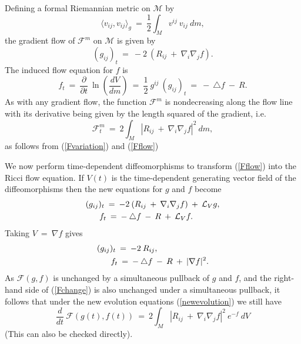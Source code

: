 \documentclass[12pt]{amsart}
\numberwithin{equation}{section}
\theoremstyle{plain}
\theoremstyle{definition}
\theoremstyle{remark}
\begin{document}
Defining a formal Riemannian metric on ${\mathcal M}$ by
\begin{equation}
\langle v_{ij}, v_{ij} \rangle_{g} \: = \: \frac12
\int_M v^{ij} \: v_{ij} \: dm, 
\end{equation}
the gradient flow of ${\mathcal F}^m$ on ${\mathcal M}$
is given by
\begin{equation} \label{Fflow}
(g_{ij})_t \: = \: -2 \: (R_{ij} \: + \: \nabla_i \nabla_j f).
\end{equation}
The induced flow equation for $f$ is
\begin{equation}
f_t \: = \: \frac{\partial}{\partial t} \: \ln \left( \frac{dV}{dm}\right) 
\: = \: \frac12 \: g^{ij} \: (g_{ij})_t \: = \: - \: \triangle f \: - \: R.
\end{equation}
As with any gradient flow, the function ${\mathcal F}^m$ is nondecreasing
along the flow line with its derivative being given by the
length squared of the gradient, i.e.
\begin{equation} \label{Fchange}
{\mathcal F}^m_t \: = \: 2 \int_M |R_{ij} \: + \: \nabla_i \nabla_j f|^2 \: dm,
\end{equation}
as follows from (\ref{Fvariation}) and (\ref{Fflow})

We now perform time-dependent 
diffeomorphisms to transform (\ref{Fflow}) into the
Ricci flow equation. If $V(t)$ is the time-dependent generating vector field
of the diffeomorphisms then the new equations for $g$ and $f$ become
\begin{align}
(g_{ij})_t \: & = \: -2 \: (R_{ij} \: + \: \nabla_i \nabla_j f) \: + \:
{\mathcal L}_V g, \\
f_t & \: = \: - \: \triangle f \: - \: R \: + \: {\mathcal L}_V f. \notag
\end{align}
Taking $V \: = \: \nabla f$ gives
\begin{align} \label{newevolution}
(g_{ij})_t \: & = \: -2 \: R_{ij}, \\
f_t & \: = \: - \: \triangle f \: - \: R \: + \: |\nabla f|^2. \notag
\end{align}
As ${\mathcal F}(g, f)$ is unchanged by a simultaneous pullback of $g$ and $f$,
and the right-hand side of (\ref{Fchange}) is also unchanged under a
simultaneous pullback, it follows that 
under the new evolution equations (\ref{newevolution})
we still have
\begin{equation} \label{Fder}
\frac{d}{dt} \: {\mathcal F}(g(t), f(t)) \: = \:
2 \int_M |R_{ij} \: + \: \nabla_i \nabla_j f|^2 \: e^{-f} \: dV
\end{equation}
(This can also be checked directly).
\end{document}

